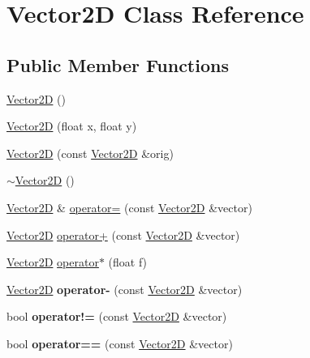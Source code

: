 \hypertarget{class_vector2_d}{\section{Vector2\-D Class Reference}
\label{class_vector2_d}
}
\subsection*{Public Member Functions}
\begin{DoxyCompactItemize}
\item 
\hyperlink{class_vector2_d_a98e9997ebb7a629f4db52397d4e0d653}{Vector2\-D} ()
\item 
\hyperlink{class_vector2_d_a166ca1df158a260a7cbf3b57ff147a4a}{Vector2\-D} (float x, float y)
\item 
\hyperlink{class_vector2_d_ac9018768c2f7f456311328e357869b7f}{Vector2\-D} (const \hyperlink{class_vector2_d}{Vector2\-D} \&orig)
\item 
\hyperlink{class_vector2_d_ac0f819527d3966874c4c9bb72ab9f67e}{$\sim$\-Vector2\-D} ()
\item 
\hyperlink{class_vector2_d}{Vector2\-D} \& \hyperlink{class_vector2_d_af05b5699876bbffdafdadd05f266a0e6}{operator=} (const \hyperlink{class_vector2_d}{Vector2\-D} \&vector)
\item 
\hyperlink{class_vector2_d}{Vector2\-D} \hyperlink{class_vector2_d_aa981ffa7ba4cda105bb77af1bc45b807}{operator+} (const \hyperlink{class_vector2_d}{Vector2\-D} \&vector)
\item 
\hyperlink{class_vector2_d}{Vector2\-D} \hyperlink{class_vector2_d_a55b5ccecc76a69b90a0e14947f420e5f}{operator$\ast$} (float f)
\item 
\hypertarget{class_vector2_d_a6ae02a67736a446dd93cb695f26c52f5}{\hyperlink{class_vector2_d}{Vector2\-D} {\bfseries operator-\/} (const \hyperlink{class_vector2_d}{Vector2\-D} \&vector)}\label{class_vector2_d_a6ae02a67736a446dd93cb695f26c52f5}

\item 
\hypertarget{class_vector2_d_adf1ab9e058db4b96ea2ab907af5e5246}{bool {\bfseries operator!=} (const \hyperlink{class_vector2_d}{Vector2\-D} \&vector)}\label{class_vector2_d_adf1ab9e058db4b96ea2ab907af5e5246}

\item 
\hypertarget{class_vector2_d_a3b224bec55b3e1275ff163de018450c6}{bool {\bfseries operator==} (const \hyperlink{class_vector2_d}{Vector2\-D} \&vector)}\label{class_vector2_d_a3b224bec55b3e1275ff163de018450c6}


\end{DoxyCompactItemize}
